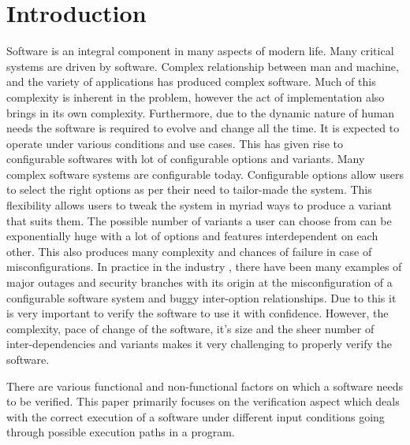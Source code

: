 \documentclass[ runningheads,
               a4paper]{llncs}
\begin{document}
\section{Introduction}
Software is an integral component in many aspects of modern life. Many critical systems are driven by software. Complex relationship between man and machine, and the variety of applications has produced complex software. Much of this complexity is inherent in the problem, however the act of implementation also brings in its own complexity. Furthermore, due to the dynamic nature of human needs the software is required to evolve and change all the time. It is expected to operate under various conditions and use cases. This has given rise to configurable softwares with lot of configurable options and variants. Many complex software systems are configurable today. Configurable options allow users to select the right options as per their need to tailor-made the system. This flexibility allows users to tweak the system in myriad ways to produce a variant that suits them. The possible number of variants a user can choose from can be exponentially huge with a lot of options and features interdependent on each other. This also produces many complexity and chances of failure in case of misconfigurations. In practice in the industry \cite[Holistic configuration management at facebook]{tang2015holistic}, there have been many examples of major outages and security branches with its origin at the misconfiguration of a configurable software system and buggy inter-option relationships. Due to this it is very important to verify the software to use it with confidence. However, the complexity, pace of change of the software, it's size and the sheer number of inter-dependencies and variants makes it very challenging to properly verify the software.


There are various functional and non-functional factors on which a software needs to be verified. This paper primarily focuses on the verification aspect which deals with the correct execution of a software under different input conditions going through possible execution paths in a program.
\end{document}
